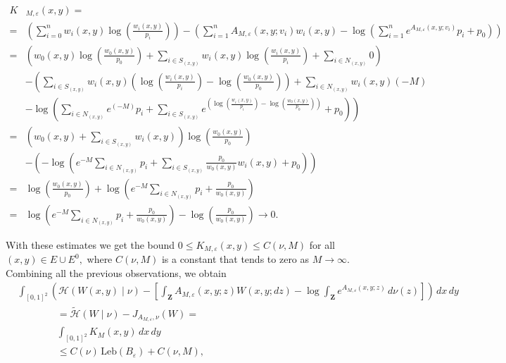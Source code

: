 \documentclass[12pt,twoside,a4paper]{article}
\newcommand{\Space}{\mathbf{Z}}
\newcommand{\lep}{\left(}
\newcommand{\rip}{\right)}
\begin{document}
\begin{align*}
    K&_{M,\varepsilon}(x,y)=\\
    =&\left(\sum^n_{i=0} w_i(x,y) \log \left(\frac{w_i(x,y)}{p_i}\right)\right) -\left(\sum^n_{i=1}A_{M,\varepsilon}(x,y;v_i)w_i(x,y)-\log\lep\sum^n_{i=1}e^{A_{M,\varepsilon}(x,y;v_i)}p_i+p_0\rip\right)
    \end{align*}
\begin{align*}
 =&\left(w_0(x,y) \log \left(\frac{w_0(x,y)}{p_0}\right)+\sum_{i\in S_{(x,y)}}w_i(x,y) \log \left(\frac{w_i(x,y)}{p_i}\right)+\sum_{i\in N_{(x,y)}}0\right)\\
 & -\left(\sum_{i\in S_{(x,y)}}w_i(x,y)   \left( \log \left(\frac{w_i(x,y)}{p_i}\right)-\log\left(\frac{w_0(x,y)}{p_0}\right)\right)+\sum_{i\in N_{(x,y)}}w_i(x,y) \left(-M\right)\right.\\
    &-\left. \log\lep\sum_{i\in N_{(x,y)}}e^{\left(-M\right)}p_i+\sum_{i\in S_{(x,y)}}e^{ \left( \log \left(\frac{w_i(x,y)}{p_i}\right)-\log\left(\frac{w_0(x,y)}{p_0}\right)\right)}+p_0\rip\right)\\
 =&\left(w_0(x,y)+\sum_{i\in S_{(x,y)}}w_i(x,y)\right) \log \left(\frac{w_0(x,y)}{p_0}\right)\\
 & -\left( -\log\lep e^{-M}\sum_{i\in N_{(x,y)}}p_i+\sum_{i\in S_{(x,y)}}\frac{p_0}{w_0(x,y)}w_i(x,y)+p_0\rip\right)\\ 
    =&\log \left(\frac{w_0(x,y)}{p_0}\right) + \log\left(e^{-M}\sum_{i\in N_{(x,y)}}p_i+\frac{p_0}{w_0(x,y)}\right)\\ 
    =&\log\left(e^{-M}\sum_{i\in N_{(x,y)}}p_i+\frac{p_0}{w_0(x,y)}\right)-\log \left(\frac{p_0}{w_0(x,y)}\right)\longrightarrow 0.
\end{align*}



With these estimates we get the bound  $0\leq  K_{M,\varepsilon}(x,y)\leq C(\nu, M)$ for all $(x,y)\in E\cup E^0,$ where $C(\nu, M)$ is a constant that tends to zero as $M \to \infty$. Combining all the previous observations, we obtain
\begin{equation*}
\begin{aligned}
     &\int_{[0,1]^2} \left(\mathcal{H}(W(x,y) \mid \nu) - \left[ \int_{\Space} A_{M,\varepsilon}(x,y;z) W(x,y;dz) - \log \int_\Space e^{A_{M,\varepsilon}(x,y;z)} \, d\nu(z) \right] \right)\, dx \, dy\\
     &\qquad \qquad=\widetilde{\mathcal{H}}(W \mid \nu)-J_{A_{M,\varepsilon},\nu}(W)=\\
     &\qquad \qquad\int_{[0,1]^2} K_{M}(x, y) \, dx \, dy \\
     &\qquad \qquad \leq C(\nu) \, \text{Leb}(B_{\varepsilon}) + C(\nu, M),
\end{aligned}
\end{equation*}
\end{document}
